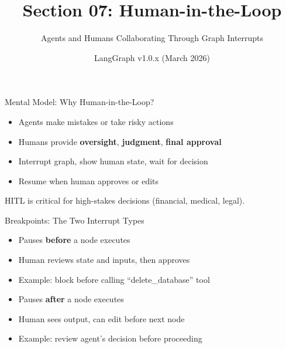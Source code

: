 \documentclass[aspectratio=169,11pt]{beamer}
\title{Section 07: Human-in-the-Loop}
\subtitle{Agents and Humans Collaborating Through Graph Interrupts}
\author{LangGraph v1.0.x (March 2026)}
\date{}
\begin{document}
\frame{\titlepage}

\begin{frame}{Mental Model: Why Human-in-the-Loop?}
  \begin{conceptbox}
    \setlength{\itemsep}{1pt}
    \begin{itemize}
      \item Agents make mistakes or take risky actions
      \item Humans provide \textbf{oversight}, \textbf{judgment}, \textbf{final approval}
      \item Interrupt graph, show human state, wait for decision
      \item Resume when human approves or edits
    \end{itemize}
  \end{conceptbox}
  \vspace{0.1cm}
  \begin{tipbox}
    HITL is critical for high-stakes decisions (financial, medical, legal).
  \end{tipbox}
\end{frame}

\begin{frame}{Breakpoints: The Two Interrupt Types}
  \begin{conceptbox}
    \setlength{\itemsep}{1pt}
    \begin{itemize}
      \item Pauses \textbf{before} a node executes
      \item Human reviews state and inputs, then approves
      \item Example: block before calling ``delete\_database'' tool
    \end{itemize}
  \end{conceptbox}
  \vspace{0.1cm}
  \begin{conceptbox}
    \setlength{\itemsep}{1pt}
    \begin{itemize}
      \item Pauses \textbf{after} a node executes
      \item Human sees output, can edit before next node
      \item Example: review agent's decision before proceeding
    \end{itemize}
  \end{conceptbox}
\end{frame}
\end{document}
